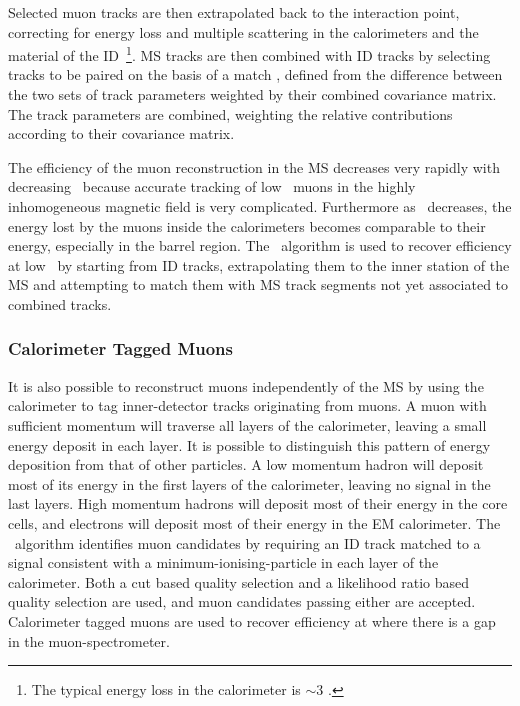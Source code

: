 Selected muon tracks are then extrapolated back to the interaction point,
correcting for energy loss and multiple scattering in the calorimeters and the
material of the ID~\footnote{The typical energy loss in the calorimeter is $\sim
3$ \GeV.}. MS tracks are then combined with ID tracks by selecting tracks to be
paired on the basis of a match \chisquared, defined from the difference between
the two sets of track parameters weighted by their combined covariance matrix.
The track parameters are combined, weighting the relative contributions
according to their covariance matrix.

The efficiency of the muon reconstruction in the MS decreases very rapidly with
decreasing \pt\ because accurate tracking of low \pt\ muons in the highly
inhomogeneous magnetic field is very complicated.
Furthermore as \pt\ decreases, the energy lost by the muons inside the
calorimeters becomes comparable to their energy, especially in the barrel
region. The \mutag\ algorithm is used to recover efficiency at low \pt\ by
starting from ID tracks, extrapolating them to the inner station of the MS and
attempting to match them with MS track segments not yet associated to combined
tracks.

\subsubsection{Calorimeter Tagged Muons}

It is also possible to reconstruct muons independently of the MS by using the calorimeter to tag inner-detector tracks originating from muons.
 A muon
with sufficient momentum will traverse all layers of the calorimeter,
leaving a small energy deposit in each layer. It is possible to distinguish this
pattern of energy deposition from that of other particles. A low
momentum hadron will deposit most of its energy in the first layers of the
calorimeter, leaving no signal in the last layers. High momentum hadrons will
deposit most of their energy in the core cells, and electrons will deposit most of their energy
in the EM calorimeter. The \CaloTrkMuID\ algorithm identifies muon candidates by
requiring an ID track matched to a signal consistent
with a minimum-ionising-particle in each layer of the
calorimeter. 
Both a cut based quality selection and a likelihood
ratio based quality selection are used, and muon candidates passing either are
accepted. Calorimeter tagged muons are used to recover efficiency at
 where there is a gap in the muon-spectrometer.

